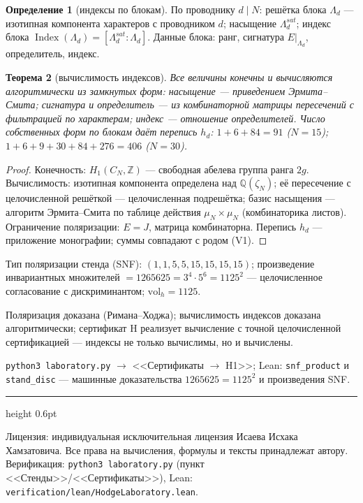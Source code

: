 \documentclass[11pt,a4paper]{article}
\theoremstyle{plain}
\newtheorem{theorem}{Теорема}
\theoremstyle{definition}
\newtheorem{definition}[theorem]{Определение}
\theoremstyle{remark}
\newcommand{\ZZ}{\mathbb{Z}}
\newcommand{\QQ}{\mathbb{Q}}
\newcommand{\Ind}{\operatorname{Index}}
\begin{document}
\begin{definition}[индексы по блокам]
По проводнику $d\mid N$: решётка блока
$\Lambda_d$ --- изотипная компонента характеров с проводником $d$;
насыщение $\Lambda_d^{sat}$; индекс блока
$\Ind(\Lambda_d)=[\Lambda_d^{sat}:\Lambda_d]$. Данные блока: ранг,
сигнатура $E|_{\Lambda_d}$, определитель, индекс.
\end{definition}

\begin{theorem}[вычислимость индексов]\label{th:indcomp}
Все величины конечны и вычисляются алгоритмически из замкнутых форм:
насыщение --- приведением Эрмита--Смита; сигнатура и определитель ---
из комбинаторной матрицы пересечений с фильтрацией по характерам;
индекс --- отношение определителей. Число собственных форм по блокам
даёт перепись $h_d$: $1+6+84=91$ ($N=15$);
$1+6+9+30+84+276=406$ ($N=30$).
\end{theorem}

\begin{proof}
Конечность: $H_1(C_N,\ZZ)$ --- свободная абелева группа ранга $2g$.
Вычислимость: изотипная компонента определена над $\QQ(\zeta_N)$;
её пересечение с целочисленной решёткой --- целочисленная
подрешётка; базис насыщения --- алгоритм Эрмита--Смита по таблице
действия $\mu_N\times\mu_N$ (комбинаторика листов). Ограничение
поляризации: $E=J$, матрица комбинаторна. Перепись $h_d$ ---
приложение монографии; суммы совпадают с родом (V1).
\end{proof}

\begin{databox}
Тип поляризации стенда (SNF): $(1,1,5,5,15,15,15,15)$;
произведение инвариантных множителей $=1265625=3^4\cdot5^6
=1125^2$ --- целочисленное согласование с дискриминантом;
$\mathrm{vol}_h=1125$.
\end{databox}

\begin{statusbox}[итог]
Поляризация доказана (Римана--Ходжа); вычислимость индексов
доказана алгоритмически; сертификат H реализует вычисление с точной
целочисленной сертификацией --- индексы не только вычислимы, но и
вычислены.
\end{statusbox}

\begin{verifybox}
\texttt{python3 laboratory.py} $\to$ <<Сертификаты $\to$ H1>>;
Lean: \texttt{snf\_product} и \texttt{stand\_disc} --- машинные
доказательства $1265625=1125^2$ и произведения SNF.
\end{verifybox}

\vfill
{\color{linkblue}\hrule height 0.6pt}
\vspace{0.5em}
{\small\color{gray}
Лицензия: индивидуальная исключительная лицензия Исаева Исхака Хамзатовича.
Все права на вычисления, формулы и тексты принадлежат автору.
Верификация: \texttt{python3 laboratory.py} (пункт <<Стенды>>/<<Сертификаты>>),
Lean: \texttt{verification/lean/HodgeLaboratory.lean}.
}
\end{document}

